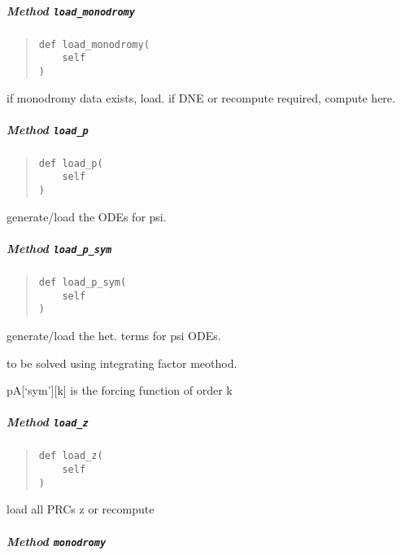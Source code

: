 \documentclass[
  english,
  a4paper,
  oneside]{article}
\begin{document}
\hypertarget{StrongCoupling.StrongCoupling.load_monodromy}{%
\subparagraph{\texorpdfstring{Method
\texttt{load\_monodromy}}{Method load\_monodromy}}\label{StrongCoupling.StrongCoupling.load_monodromy}}

\begin{quote}
\begin{verbatim}
def load_monodromy(
    self
)
\end{verbatim}
\end{quote}

if monodromy data exists, load. if DNE or recompute required, compute
here.

\hypertarget{StrongCoupling.StrongCoupling.load_p}{%
\subparagraph{\texorpdfstring{Method
\texttt{load\_p}}{Method load\_p}}\label{StrongCoupling.StrongCoupling.load_p}}

\begin{quote}
\begin{verbatim}
def load_p(
    self
)
\end{verbatim}
\end{quote}

generate/load the ODEs for psi.

\hypertarget{StrongCoupling.StrongCoupling.load_p_sym}{%
\subparagraph{\texorpdfstring{Method
\texttt{load\_p\_sym}}{Method load\_p\_sym}}\label{StrongCoupling.StrongCoupling.load_p_sym}}

\begin{quote}
\begin{verbatim}
def load_p_sym(
    self
)
\end{verbatim}
\end{quote}

generate/load the het. terms for psi ODEs.

to be solved using integrating factor meothod.

pA{[}`sym'{]}{[}k{]} is the forcing function of order k

\hypertarget{StrongCoupling.StrongCoupling.load_z}{%
\subparagraph{\texorpdfstring{Method
\texttt{load\_z}}{Method load\_z}}\label{StrongCoupling.StrongCoupling.load_z}}

\begin{quote}
\begin{verbatim}
def load_z(
    self
)
\end{verbatim}
\end{quote}

load all PRCs z or recompute

\hypertarget{StrongCoupling.StrongCoupling.monodromy}{%
\subparagraph{\texorpdfstring{Method
\texttt{monodromy}}{Method monodromy}}\label{StrongCoupling.StrongCoupling.monodromy}}
\end{document}
